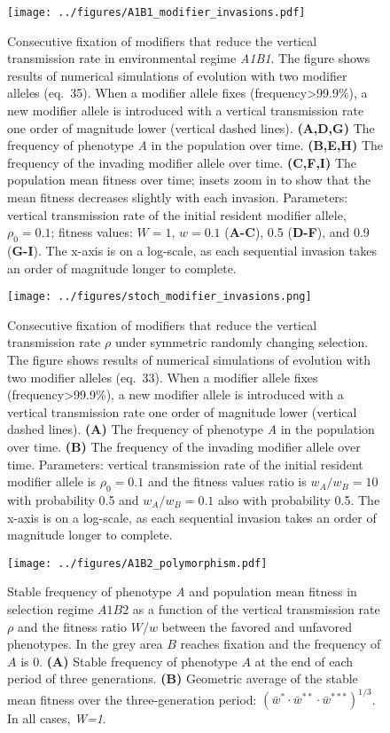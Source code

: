 \documentclass[]{article}
\begin{document}
\begin{figure}
\centering
\texttt{[image: ../figures/A1B1\_modifier\_invasions.pdf]}
\caption{Consecutive fixation of modifiers that reduce the vertical
transmission rate in environmental regime \emph{A1B1}. The figure shows
results of numerical simulations of evolution with two modifier alleles
(eq.\ 35). When a modifier allele fixes
(frequency\textgreater{}99.9\%), a new modifier allele is introduced
with a vertical transmission rate one order of magnitude lower (vertical
dashed lines). \textbf{(A,D,G)} The frequency of phenotype \emph{A} in
the population over time. \textbf{(B,E,H)} The frequency of the invading
modifier allele over time. \textbf{(C,F,I)} The population mean
fitness over time; insets zoom in to show that the mean fitness 
decreases slightly with each invasion. Parameters: vertical transmission rate of
the initial resident modifier allele, \(\rho_0 =0.1\); fitness values:
$W=1$, $w=0.1$ (\textbf{A-C}), 0.5 (\textbf{D-F}), and 0.9
(\textbf{G-I}). The x-axis is on a log-scale, as each sequential invasion
takes an order of magnitude longer to
complete.}\label{fig:A1B1_modifier_invasions}
\end{figure}

\begin{figure}
\centering
\texttt{[image: ../figures/stoch\_modifier\_invasions.png]}
\caption{Consecutive fixation of modifiers that reduce the vertical transmission rate $\rho$ under symmetric randomly changing selection.
The figure shows results of numerical simulations of evolution with two modifier alleles
(eq.\ 33).
When a modifier allele fixes (frequency\textgreater{}99.9\%),
a new modifier allele is introduced with a vertical transmission rate one order of magnitude lower (vertical dashed lines).
\textbf{(A)} The frequency of phenotype \emph{A} in the population over time.
\textbf{(B)} The frequency of the invading modifier allele over time.
Parameters: vertical transmission rate of the initial resident modifier allele is \(\rho_0 =0.1\) and the fitness values ratio is $w_A/w_B=10$ with probability 0.5 and $w_A/w_B=0.1$ also with probability 0.5.
The x-axis is on a log-scale, as each sequential invasion takes an order of magnitude longer to complete.}\label{fig:stoch_modifier_invasions}
\end{figure}

\begin{figure}
\centering
\texttt{[image: ../figures/A1B2\_polymorphism.pdf]}
\caption{Stable frequency of phenotype \emph{A} and population mean fitness in selection regime
$A1B2$ as a function of the vertical transmission rate \(\rho\) and the fitness ratio \(W/w\) between the favored and unfavored phenotypes.
In the grey area \(B\) reaches fixation and the frequency of \(A\) is 0.
\textbf{(A)} Stable frequency of phenotype $A$ at the end of each period of three generations.
\textbf{(B)} Geometric average of the stable mean fitness over the three-generation period: $(\bar{w}^* \cdot \bar{w}^{**} \cdot \bar{w}^{***})^{1/3}$.
In all cases, \emph{W=1}.}\label{fig:A1B2_polymorphism}
\end{figure}
\end{document}
